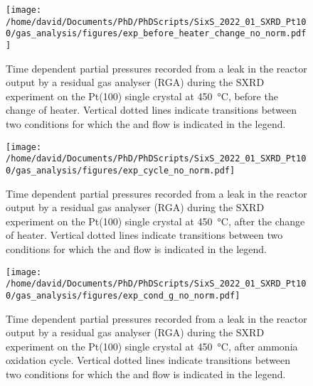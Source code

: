 \begin{figure}[!htb]
    \centering
    \texttt{[image: /home/david/Documents/PhD/PhDScripts/SixS\_2022\_01\_SXRD\_Pt100/gas\_analysis/figures/exp\_before\_heater\_change\_no\_norm.pdf]}
    \caption{
        Time dependent partial pressures recorded from a leak in the reactor output by a residual gas analyser (RGA) during the SXRD experiment on the Pt(100) single crystal at \qty{450}{\degreeCelsius}, before the change of heater.
        Vertical dotted lines indicate transitions between two conditions for which the  and  flow is indicated in the legend.
    }
    \label{fig:RGA450Pt100BeforeHeaterChange}
\end{figure}

\begin{figure}[!htb]
    \centering
    \texttt{[image: /home/david/Documents/PhD/PhDScripts/SixS\_2022\_01\_SXRD\_Pt100/gas\_analysis/figures/exp\_cycle\_no\_norm.pdf]}
    \caption{
        Time dependent partial pressures recorded from a leak in the reactor output by a residual gas analyser (RGA) during the SXRD experiment on the Pt(100) single crystal at \qty{450}{\degreeCelsius}, after the change of heater.
        Vertical dotted lines indicate transitions between two conditions for which the  and  flow is indicated in the legend.
    }
    \label{fig:RGA450Pt100Cycle}
\end{figure}

\begin{figure}[!htb]
    \centering
    \texttt{[image: /home/david/Documents/PhD/PhDScripts/SixS\_2022\_01\_SXRD\_Pt100/gas\_analysis/figures/exp\_cond\_g\_no\_norm.pdf]}
    \caption{
        Time dependent partial pressures recorded from a leak in the reactor output by a residual gas analyser (RGA) during the SXRD experiment on the Pt(100) single crystal at \qty{450}{\degreeCelsius}, after ammonia oxidation cycle.
        Vertical dotted lines indicate transitions between two conditions for which the  and  flow is indicated in the legend.
    }
    \label{fig:RGA450Pt100CondG}
\end{figure}